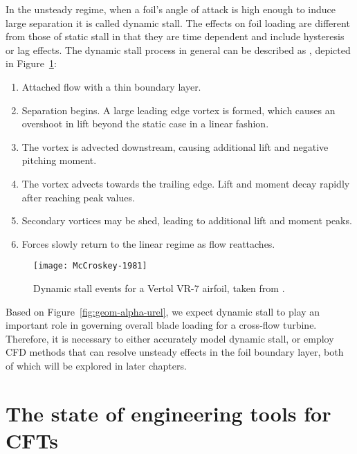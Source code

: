 In the unsteady regime, when a foil's angle of attack is high enough to induce
large separation it is called dynamic stall. The effects on foil loading are
different from those of static stall in that they are time dependent and include
hysteresis or lag effects. The dynamic stall process in general can be described
as \cite{McCroskey1981}, depicted in Figure~\ref{fig:McCroskey}:
\begin{enumerate}
    \item Attached flow with a thin boundary layer.

    \item Separation begins. A large leading edge vortex is formed, which causes
    an overshoot in lift beyond the static case in a linear fashion.

    \item The vortex is advected downstream, causing additional lift and
    negative pitching moment.

    \item The vortex advects towards the trailing edge. Lift and moment decay
    rapidly after reaching peak values.

    \item Secondary vortices may be shed, leading to additional lift and moment
    peaks.

    \item Forces slowly return to the linear regime as flow reattaches.
\end{enumerate}

\begin{figure}
    \centering

    \texttt{[image: McCroskey-1981]}

    \caption{Dynamic stall events for a Vertol VR-7 airfoil, taken from
        \cite{McCroskey1981}.}

    \label{fig:McCroskey}
\end{figure}

Based on Figure~\ref{fig:geom-alpha-urel}, we expect dynamic stall to play an
important role in governing overall blade loading for a cross-flow turbine.
Therefore, it is necessary to either accurately model dynamic stall, or employ
CFD methods that can resolve unsteady effects in the foil boundary layer, both
of which will be explored in later chapters.


\section{The state of engineering tools for CFTs}

